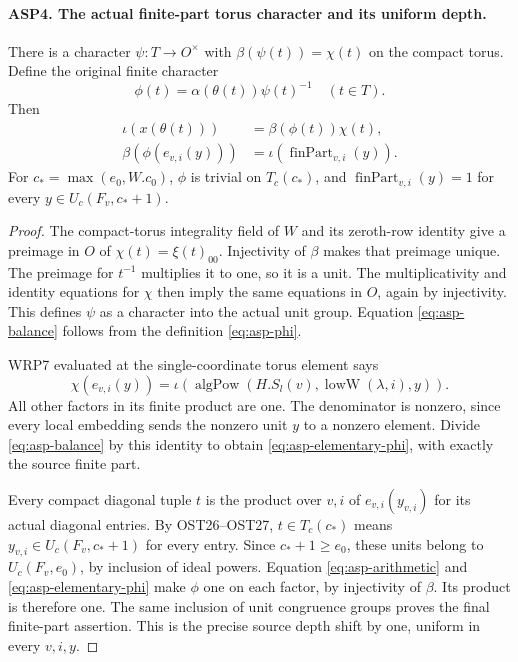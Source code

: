 \paragraph{ASP4. The actual finite-part torus character and its uniform depth.}
\label{claim:ASP4}
There is a character $\psi:T\to O^\times$ with
$\beta(\psi(t))=\chi(t)$ on the compact torus.
Define the original finite character
\begin{equation}\label{eq:asp-phi}
          \phi(t)=\alpha(\theta(t))\psi(t)^{-1}
                              \quad(t\in T).
\end{equation}
Then
\begin{align}
 \iota(x(\theta(t)))&=\beta(\phi(t))\chi(t),
                                       \label{eq:asp-balance}\\
 \beta(\phi(e_{v,i}(y)))&=
                             \iota(\operatorname{finPart}_{v,i}(y)).
                                       \label{eq:asp-elementary-phi}
\end{align}
For $c_* =\max(e_0,W.c_0)$, $\phi$ is trivial on
$T_c(c_*)$, and
$\operatorname{finPart}_{v,i}(y)=1$ for every
$y\in U_c(F_v,c_*+1)$.
\begin{proof}
The compact-torus integrality field of $W$ and
its zeroth-row identity give a preimage in $O$
of $\chi(t)=\xi(t)_{00}$.  Injectivity of $\beta$
makes that preimage unique.  The preimage for
$t^{-1}$ multiplies it to one, so it is a unit.
The multiplicativity and identity equations for
$\chi$ then imply the same equations in $O$,
again by injectivity.  This defines $\psi$ as
a character into the actual unit group.  Equation
\eqref{eq:asp-balance} follows from the definition
\eqref{eq:asp-phi}.

WRP7 evaluated at the single-coordinate torus
element says
\[
 \chi(e_{v,i}(y))=
       \iota(\operatorname{algPow}(H.S_l(v),
                              \operatorname{lowW}(\lambda,i),y)).
\]
All other factors in its finite product are one.
The denominator is nonzero, since every local
embedding sends the nonzero unit $y$ to a nonzero
element.  Divide \eqref{eq:asp-balance} by this
identity to obtain \eqref{eq:asp-elementary-phi},
with exactly the source finite part.

Every compact diagonal tuple $t$ is the product
over $v,i$ of $e_{v,i}(y_{v,i})$ for its actual
diagonal entries.  By OST26--OST27,
$t\in T_c(c_*)$ means
$y_{v,i}\in U_c(F_v,c_*+1)$ for every entry.
Since $c_*+1\geq e_0$, these units belong to
$U_c(F_v,e_0)$, by inclusion of ideal powers.
Equation \eqref{eq:asp-arithmetic} and
\eqref{eq:asp-elementary-phi} make $\phi$ one
on each factor, by injectivity of $\beta$.
Its product is therefore one.  The same inclusion
of unit congruence groups proves the final
finite-part assertion.  This is the precise
source depth shift by one, uniform in every
$v,i,y$.
\end{proof}

